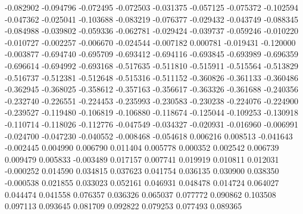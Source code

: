 -0.082902
-0.094796
-0.072495
-0.072503
-0.031375
-0.057125
-0.075372
-0.102594
-0.047362
-0.025041
-0.103688
-0.083219
-0.076377
-0.029432
-0.043749
-0.088345
-0.084988
-0.039802
-0.059336
-0.062781
-0.029424
-0.039737
-0.059246
-0.010220
-0.010727
-0.002257
-0.006670
-0.024544
-0.007182
0.000781
-0.019431
-0.120000
-0.003877
-0.694740
-0.695709
-0.693412
-0.694116
-0.693845
-0.693989
-0.696359
-0.696614
-0.694992
-0.693168
-0.517635
-0.511810
-0.515911
-0.515564
-0.513829
-0.516737
-0.512381
-0.512648
-0.515316
-0.511152
-0.360826
-0.361133
-0.360486
-0.362945
-0.368025
-0.358612
-0.357163
-0.356617
-0.363326
-0.361688
-0.240356
-0.232740
-0.226551
-0.224453
-0.235993
-0.230583
-0.230238
-0.224076
-0.224900
-0.239527
-0.119480
-0.106819
-0.106880
-0.118674
-0.125044
-0.109253
-0.130918
-0.110714
-0.118026
-0.112776
-0.047549
-0.034327
-0.020931
-0.016960
-0.006991
-0.024700
-0.047230
-0.040552
-0.008468
-0.054618
0.006216
0.008513
-0.041643
-0.002445
0.004990
0.006790
0.011404
0.005778
0.000352
0.002542
0.006739
0.009479
0.005833
-0.003489
0.017157
0.007741
0.019919
0.010811
0.012031
-0.000252
0.014590
0.034815
0.037623
0.041754
0.036135
0.030900
0.038350
-0.000538
0.021855
0.033023
0.052161
0.046931
0.048478
0.014724
0.064027
0.044474
0.041558
0.076357
0.036326
0.065037
0.077772
0.090862
0.103508
0.097113
0.093645
0.081709
0.092822
0.079253
0.077493
0.089365
